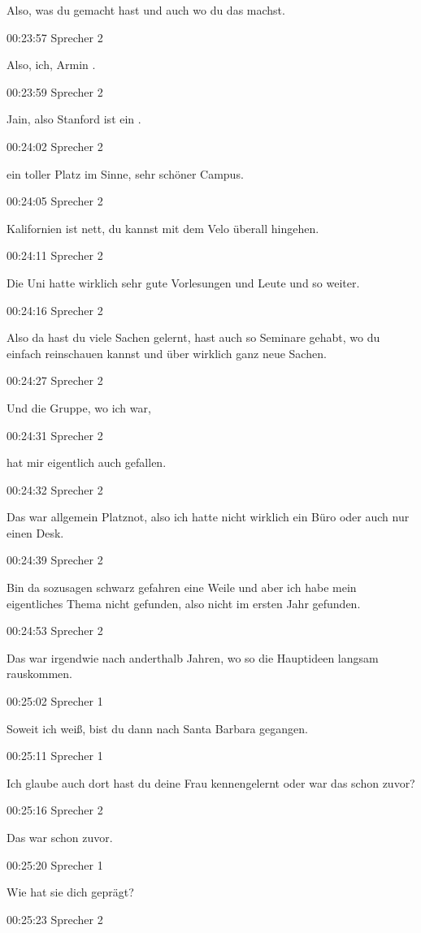 Also, was du gemacht hast und auch wo du das machst.

00:23:57 Sprecher 2

Also, ich, Armin .

00:23:59 Sprecher 2

Jain, also Stanford ist ein .

00:24:02 Sprecher 2

ein toller Platz im Sinne, sehr schöner Campus.

00:24:05 Sprecher 2

Kalifornien ist nett, du kannst mit dem Velo überall hingehen.

00:24:11 Sprecher 2

Die Uni hatte wirklich sehr gute Vorlesungen und Leute und so weiter.

00:24:16 Sprecher 2

Also da hast du viele Sachen gelernt, hast auch so Seminare gehabt, wo
du einfach reinschauen kannst und über wirklich ganz neue Sachen.

00:24:27 Sprecher 2

Und die Gruppe, wo ich war,

00:24:31 Sprecher 2

hat mir eigentlich auch gefallen.

00:24:32 Sprecher 2

Das war allgemein Platznot, also ich hatte nicht wirklich ein Büro oder
auch nur einen Desk.

00:24:39 Sprecher 2

Bin da sozusagen schwarz gefahren eine Weile und aber ich habe mein
eigentliches Thema nicht gefunden, also nicht im ersten Jahr gefunden.

00:24:53 Sprecher 2

Das war irgendwie nach anderthalb Jahren, wo so die Hauptideen langsam
rauskommen.

00:25:02 Sprecher 1

Soweit ich weiß, bist du dann nach Santa Barbara gegangen.

00:25:11 Sprecher 1

Ich glaube auch dort hast du deine Frau kennengelernt oder war das schon
zuvor?

00:25:16 Sprecher 2

Das war schon zuvor.

00:25:20 Sprecher 1

Wie hat sie dich geprägt?

00:25:23 Sprecher 2

